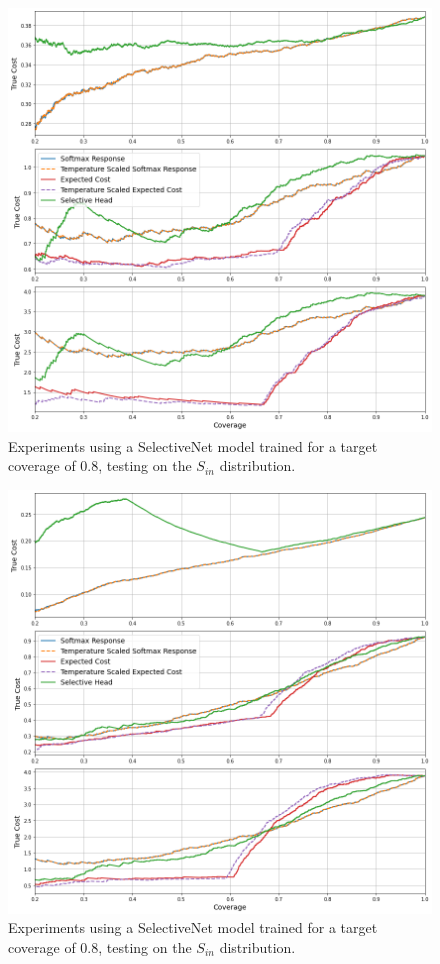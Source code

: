 \begin{figure}[H]
	\includegraphics[width=\textwidth]{images/binary/sn0.8_out_distribution.png}
	\caption*{Experiments using a SelectiveNet model trained for a target coverage of 0.8, testing on the $S_{in}$ distribution.}
\end{figure}

\begin{figure}[H]
	\includegraphics[width=\textwidth]{images/binary/sn0.8_combine_distribution.png}
	\caption*{Experiments using a SelectiveNet model trained for a target coverage of 0.8, testing on the $S_{in}$ distribution.}
\end{figure}

